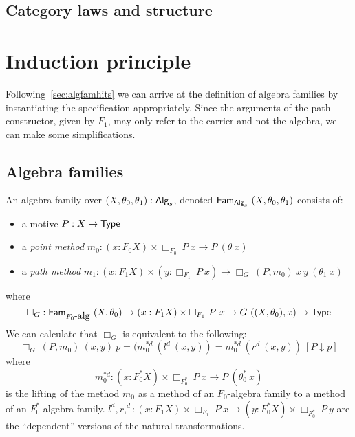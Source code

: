 \documentclass[a4paper,10pt]{report}
\begin{document}

\subsection{Category laws and structure}


\section{Induction principle}

Following~\cref{sec:algfamhits} we can arrive at the definition of
algebra families by instantiating the specification
appropriately. Since the arguments of the path constructor, given by
$F_1$, may only refer to the carrier and not the algebra, we can make
some simplifications.

\subsection{Algebra families}

\begin{defn}
  An algebra family over $(X,\theta_0,\theta_1) : \mathsf{Alg}_s$, denoted
  $\mathsf{Fam}_{\mathsf{Alg}_s}\ (X,\theta_0,\theta_1)$ consists of:

  \begin{itemize}
  \item a motive $P : X \to \mathsf{Type}$
  \item a \emph{point method} $m_0 : (x : F_0 X) \times \Box_{F_0}\  P\ x \to P\ (\theta\ x)$
  \item a \emph{path method} $m_1 : (x : F_1 X) \times (y : \Box_{F_1}\ P\ x) \to \Box_G\ (P,m_0)\ x\ y\ (\theta_1\ x)$
  \end{itemize}
\end{defn}
where
$$
\Box_G : \famover{\algcat{F_0}}{(X,\theta_0)} \to (x : F_1 X) \times \Box_{F_1}\ P\ x \to G\ ((X,\theta_0),x) \to \Type
$$
We can calculate that $\Box_G$ is equivalent to the following:
$$
\Box_G\ (P,m_0)\ (x, y)\ p = (m_0^{*d}\ (l^d\ (x , y)) = m_0^{*d}\ (r^d\ (x , y))\ [ P \downarrow p ]
$$
where
$$
m_0^{*d} : (x : F_0^* X) \times \Box_{F_0^*}\ P\ x \to P\ (\theta_0^*\ x)
$$
is the lifting of the method $m_0$ as a method of an $F_0$-algebra
family to a method of an $F_0^*$-algebra family.
$l^d, r,^d : (x : F_1 X) \times \Box_{F_1}\ P\ x \to (y : F_0^* X)
\times \Box_{F_0^*}\ P\ y$
are the ``dependent'' versions of the natural transformations.
\end{document}
